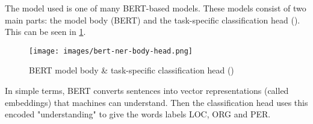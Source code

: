 The model used is one of many BERT-based models. These models consist of two main parts: the model body (BERT) and the task-specific classification head (\cite{tunstall_natural_2022}). This can be seen in \ref{fig:bert-ner-body-head}.

\begin{figure}[h]
    \centering
    \texttt{[image: images/bert-ner-body-head.png]}
    \caption{BERT model body \& task-specific classification head (\cite{tunstall_natural_2022})}
    \label{fig:bert-ner-body-head}
\end{figure}

In simple terms, BERT converts sentences into vector representations (called embeddings) that machines can understand. Then the classification head uses this encoded "understanding" to give the words labels LOC, ORG and PER.